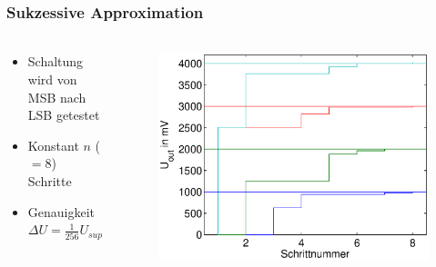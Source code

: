 \begin{frame}
    \frametitle{Sukzessive Approximation}
    \framesubtitle{}
    \begin{columns}[c]
            \begin{block}{}
                \begin{itemize}
                    \item Schaltung wird von MSB nach LSB getestet
                    \item Konstant $n$ ($=8$) Schritte
                    \item Genauigkeit $\Delta U = \frac{1}{256} U_{sup}$
                \end{itemize}
            \end{block}
            \begin{figure}[H]
            \begin{center}
                    \includegraphics[scale=0.4]{./img/graph/Aufgabe2a.eps}
            \end{center}
            \end{figure}
    \end{columns}
\end{frame}

